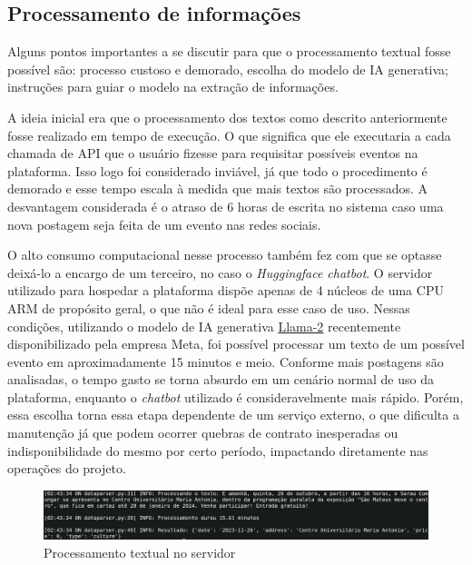 \subsection{Processamento de informações}
\label{sec:infoProcessing}

Alguns pontos importantes a se discutir para que o processamento textual fosse
possível são: processo custoso e demorado, escolha do modelo de \acs{IA}
generativa; instruções para guiar o modelo na extração de informações.

A ideia inicial era que o processamento dos textos como descrito anteriormente
fosse realizado em tempo de execução. O que significa que ele executaria a cada
chamada de \acs{API} que o usuário fizesse para requisitar possíveis eventos na
plataforma. Isso logo foi considerado inviável, já que todo o procedimento é
demorado e esse tempo escala à medida que mais textos são processados. A
desvantagem considerada é o atraso de 6 horas de escrita no sistema caso uma
nova postagem seja feita de um evento nas redes sociais.

O alto consumo computacional nesse processo também fez com que se optasse
deixá-lo a encargo de um terceiro, no caso o \textit{Huggingface chatbot}. O
servidor utilizado para hospedar a plataforma dispõe apenas de 4 núcleos de uma
CPU ARM de propósito geral, o que não é ideal para esse caso de uso. Nessas
condições, utilizando o modelo de \acs{IA} generativa
\href{https://huggingface.co/TheBloke/Llama-2-13B-chat-GGUF}{Llama-2}
recentemente disponibilizado pela empresa Meta, foi possível processar um texto
de um possível evento em aproximadamente 15 minutos e meio. Conforme mais
postagens são analisadas, o tempo gasto se torna absurdo em um cenário normal
de uso da plataforma, enquanto o \textit{chatbot} utilizado é consideravelmente
mais rápido. Porém, essa escolha torna essa etapa dependente de um serviço
externo, o que dificulta a manutenção já que podem ocorrer quebras de contrato
inesperadas ou indisponibilidade do mesmo por certo período, impactando
diretamente nas operações do projeto.

\begin{figure}[h]
    \centering
    \includegraphics[width=1\textwidth]{figuras/llama_2_local.png}
    \caption{Processamento textual no servidor}
    \label{fig:enter-label}
\end{figure}

